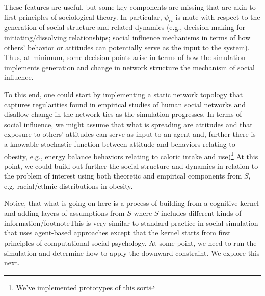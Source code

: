 \documentclass{article}
\begin{document}
These features are useful, but some key components are missing that are akin to first principles of sociological theory.  In particular, $\psi_{ct}$ is mute with respect to the generation of social structure and related dynamics (e.g., decision making for initiating/dissolving relationships; social influence mechanisms in terms of how others' behavior or attitudes can potentially serve as the input to the system).  Thus, at minimum, some decision points arise in terms of how the simulation implements generation and change in network structure the mechanism of social influence.  

To this end, one could start by implementing a static network topology that captures regularities found in empirical studies of human social networks and disallow change in the network ties as the simulation progresses.  In terms of social influence, we might assume that what is spreading are attitudes and that exposure to others' attitudes can serve as input to an agent and, further there is a knowable stochastic function between attitude and behaviors relating to obesity, e.g., energy balance behaviors relating to caloric intake and use)\footnote{We've implemented prototypes of this sort\cite{orr2017galeabook}} At this point, we could build out further the social structure and dynamics in relation to the problem of interest using both theoretic and empirical components from $S$, e.g. racial/ethnic distributions in obesity.  

Notice, that what is going on here is a process of building from a cognitive kernel and adding layers of assumptions from $S$ where $S$ includes different kinds of information/footnote{This is very similar to standard practice in social simulation that uses agent-based approaches except that the kernel starts from first principles of computational social psychology.}  At some point, we need to run the simulation and determine how to apply the downward-constraint. We explore this next.
\end{document}
